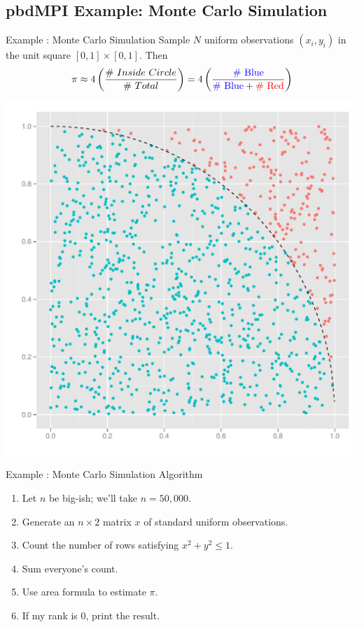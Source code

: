 \subsection{pbdMPI Example: Monte Carlo Simulation}
\makesubcontentsslidessec


\begin{frame}
  \begin{block}{Example \countex :  Monte Carlo Simulation}\pause
  Sample $N$ uniform observations $(x_i, y_i)$ in the unit square $[0, 1]\times [0,1]$.  Then
\begin{equation*}
\pi \approx 4\left(\frac{\#\ Inside\ Circle}{\#\ Total}\right) = 4\left(\frac{\text{\color{blue}{\#
Blue}}}{\text{\color{blue}{\# Blue}}+\text{\color{red}{\# Red}}}\right)
\label{eqn:pi}
\end{equation*}
  \begin{center}
   \includegraphics[scale=.25]{../common/pics/pi}
  \end{center}
  \end{block}
\end{frame}


\begin{frame}[fragile]
  \begin{block}{Example \showex :  Monte Carlo Simulation Algorithm}\pause
    \begin{enumerate}
     \item Let $n$ be big-ish; we'll take $n=50,000$.
     \item Generate an $n\times 2$ matrix $x$ of standard uniform observations.
     \item Count the number of rows satisfying $x^2 + y^2 \leq 1$.
     \item Sum everyone's count.
     \item Use area formula to estimate $\pi$.
     \item If my rank is 0, print the result.
    \end{enumerate}
  \end{block}
\end{frame}

